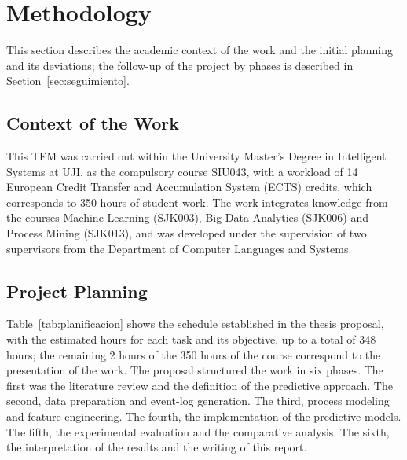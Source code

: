 \section{Methodology}
\label{sec:metodologia}

This section describes the academic context of the work and the initial planning and its deviations; the follow-up of the project by phases is described in Section~\ref{sec:seguimiento}.

\subsection{Context of the Work}

This TFM was carried out within the University Master's Degree in Intelligent Systems at UJI, as the compulsory course SIU043, with a workload of 14 European Credit Transfer and Accumulation System (ECTS) credits, which corresponds to 350 hours of student work. The work integrates knowledge from the courses Machine Learning (SJK003), Big Data Analytics (SJK006) and Process Mining (SJK013), and was developed under the supervision of two supervisors from the Department of Computer Languages and Systems.

\subsection{Project Planning}

Table~\ref{tab:planificacion} shows the schedule established in the thesis proposal, with the estimated hours for each task and its objective, up to a total of 348 hours; the remaining 2 hours of the 350 hours of the course correspond to the presentation of the work. The proposal structured the work in six phases. The first was the literature review and the definition of the predictive approach. The second, data preparation and event-log generation. The third, process modeling and feature engineering. The fourth, the implementation of the predictive models. The fifth, the experimental evaluation and the comparative analysis. The sixth, the interpretation of the results and the writing of this report.

